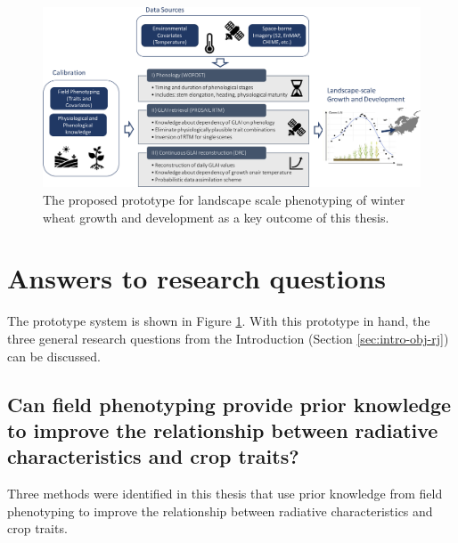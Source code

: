 \begin{figure}[H]
    \centering
    \includegraphics[width=\textwidth]{07-Discussion/img/prototype.jpg}
    \caption{The proposed prototype for landscape scale phenotyping of winter wheat growth and development as a key outcome of this thesis.}
    \label{fig:oa-disc-prototype}
\end{figure}

\section{Answers to research questions}
The prototype system is shown in Figure \ref{fig:oa-disc-prototype}. With this prototype in hand, the three general research questions from the Introduction (Section \ref{sec:intro-obj-rj}) can be discussed.

\subsection{Can field phenotyping provide prior knowledge to improve the relationship between radiative characteristics and crop traits?}
\label{subsec:oa-disc-aw-rq1}

Three methods were identified in this thesis that use prior knowledge from field phenotyping to improve the relationship between radiative characteristics and crop traits.

